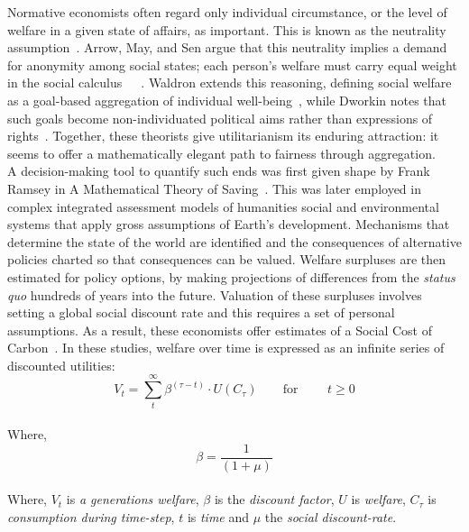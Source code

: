 \documentclass[12pt, oneside]{article}   	%
\begin{document}
Normative economists often regard only individual circumstance, or the level of welfare in a given state of affairs, as important.
This is known as the neutrality assumption~\cite{pd2}.
Arrow, May, and Sen argue that this neutrality implies a demand for anonymity among social states; each person’s welfare must carry equal weight in the social calculus~\cite{ka1}~\cite{km1}~\cite{as2}.
Waldron extends this reasoning, defining social welfare as a goal-based aggregation of individual well-being~\cite{jw2}, while Dworkin notes that such goals become non-individuated political aims rather than expressions of rights~\cite{rd1}.
Together, these theorists give utilitarianism its enduring attraction: it seems to offer a mathematically elegant path to fairness through aggregation.\\

A decision-making tool to quantify such ends was first given shape by Frank Ramsey in A Mathematical Theory of Saving~\cite{fr1}.
This was later employed in complex integrated assessment models of humanities social and environmental systems that apply gross assumptions of Earth's development.
Mechanisms that determine the state of the world are identified and the consequences of alternative policies charted so that consequences can be valued.
Welfare surpluses are then estimated for policy options, by making projections of differences from the \emph{status quo} hundreds of years into the future.
Valuation of these surpluses involves setting a global social discount rate and this requires a set of personal assumptions.
As a result, these economists offer estimates of a Social Cost of Carbon~\cite{pd2}.
In these studies, welfare over time is expressed as an infinite series of discounted utilities:\\

\begin{equation}
V_t = \sum_t^\infty \beta^{(\tau - t)} \cdot U (C_\tau)
\qquad \text{for }
\qquad t \geq 0
\end{equation}\\

Where,
\begin{equation}
\beta = \frac{1}{(1+\mu)}
\end{equation}\\

Where, $V_t$ is \emph{a generations welfare}, $\beta$ is the \emph{discount factor}, $U$ is \emph{welfare}, $C_\tau$ is \emph{consumption during time-step}, $t$ is \emph{time} and $\mu$ the \emph{social discount-rate}.\\
\end{document}
